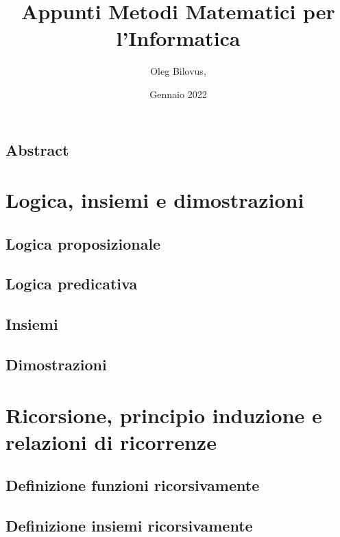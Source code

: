 \documentclass[a4paper, 12pt, oneside]{book}
\title{Appunti Metodi Matematici per l'Informatica}
\author{Oleg Bilovus, \orcidlink{0000-0001-6285-5344}}
\date{Gennaio 2022}
\theoremstyle{example}
\begin{document}


\frontmatter
\chapter*{Abstract}



\tableofcontents
\clearpage

\mainmatter
\part{Logica, insiemi e dimostrazioni}
\label{par:first}

\chapter{Logica proposizionale}
\label{cha:logica_proposizionale}


\chapter{Logica predicativa}
\label{cha:logica_predicativa}


\chapter{Insiemi}
\label{cha:insiemi}


\chapter{Dimostrazioni}
\label{cha:dimostrazioni}



\part{Ricorsione, principio induzione e relazioni di ricorrenze}
\label{par:second}

\chapter{Definizione funzioni ricorsivamente}
\label{cha:def_ric_funz}


\chapter{Definizione insiemi ricorsivamente}
\label{cha:def_ric_ins}

\end{document}
